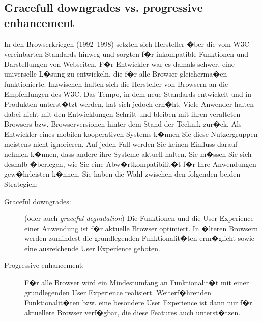 \subsection{Gracefull downgrades vs. progressive enhancement} 
In den Browserkriegen (1992--1998) setzten sich Hersteller �ber die vom W3C vereinbarten Standards hinweg und sorgten f�r inkompatible Funktionen und Darstellungen von Webseiten. F�r Entwickler war es damals schwer, eine universelle L�sung zu entwickeln, die f�r alle Browser gleicherma�en funktionierte. Inzwischen halten sich die Hersteller von Browsern an die Empfehlungen des W3C. Das Tempo, in dem neue Standards entwickelt und in Produkten unterst�tzt werden, hat sich jedoch erh�ht. Viele Anwender halten dabei nicht mit den Entwicklungen Schritt und bleiben mit ihren veralteten Browsers bzw. Browserversionen hinter dem Stand der Technik zur�ck.  
 Als Entwickler eines mobilen kooperativen Systems k�nnen Sie diese Nutzergruppen meistens nicht ignorieren. Auf jeden Fall werden Sie keinen Einfluss darauf nehmen k�nnen, dass andere ihre Systeme aktuell halten. Sie m�ssen Sie sich deshalb �berlegen, wie Sie eine Abw�rtkompatibilit�t f�r Ihre Anwendungen gew�hrleisten k�nnen. Sie haben die Wahl zwischen den folgenden beiden Strategien:
 
\begin{description}
\item[Graceful downgrades:] (oder auch \textit{graceful degradation}) Die Funktionen und die User Experience einer Anwendung ist f�r aktuelle Browser optimiert. In �lteren Browsern werden zumindest die grundlegenden Funktionalit�ten erm�glicht sowie eine ausreichende User Experience geboten.

\item[Progressive enhancement:] F�r alle Browser wird ein Mindestumfang an Funktionalit�t mit einer grundlegenden User Experience realisiert. Weiterf�hrenden Funktionalit�ten bzw. eine besondere User Experience ist dann nur f�r aktuellere Browser verf�gbar, die diese Features auch unterst�tzen. 

\end{description}


